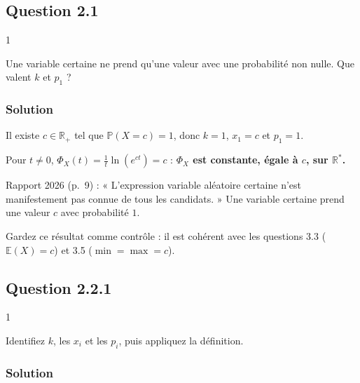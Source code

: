 \documentclass[11pt,a4paper]{article}
\begin{document}
\hypertarget{question-2.1-1}{%
\subsection{Question 2.1}\label{question-2.1-1}}

\begin{indication}{1}

Une variable certaine ne prend qu'une valeur avec une probabilité non nulle. Que valent \(k\) et \(p_1\) ?

\end{indication}

\hypertarget{solution-27}{%
\subsubsection{Solution}\label{solution-27}}

Il existe \(c\in\mathbb R_+\) tel que \(\mathbb P(X=c)=1\), donc \(k=1\), \(x_1=c\) et \(p_1=1\).

Pour \(t\ne 0\), \(\Phi_X(t)=\frac1t\ln(e^{ct})=c\) : \textbf{\(\Phi_X\) est constante, égale à \(c\), sur \(\mathbb R^*\).}

\begin{jury}

Rapport 2026 (p.~9) : « L'expression variable aléatoire certaine n'est manifestement pas connue de tous les candidats. » Une variable certaine prend une valeur \(c\) avec probabilité \(1\).

\end{jury}

\begin{methode}

Gardez ce résultat comme contrôle : il est cohérent avec les questions 3.3 (\(\mathbb E(X)=c\)) et 3.5 (\(\min=\max=c\)).

\end{methode}

\hypertarget{question-2.2.1}{%
\subsection{Question 2.2.1}\label{question-2.2.1}}

\begin{indication}{1}

Identifiez \(k\), les \(x_i\) et les \(p_i\), puis appliquez la définition.

\end{indication}

\hypertarget{solution-28}{%
\subsubsection{Solution}\label{solution-28}}
\end{document}
